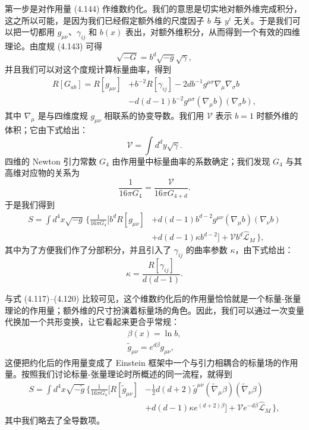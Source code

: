 第一步是对作用量 (4.144) 作维数约化。我们的意思是切实地对额外维完成积分，这之所以可能，是因为我们已经假定额外维的尺度因子 $b$ 与 $y^{i}$ 无关。于是我们可以把一切都用 $g_{\mu\nu}$、$\gamma_{ij}$ 和 $b(x)$ 表出，对额外维积分，从而得到一个有效的四维理论。由度规 (4.143) 可得
\begin{equation*}
\sqrt{-G} = b^{d}\sqrt{-g}\sqrt{\gamma},
\tag{4.145}
\end{equation*}
并且我们可以对这个度规计算标量曲率，得到
\begin{align*}
R[G_{ab}] = R[g_{\mu\nu}] &+ b^{-2}R[\gamma_{ij}] - 2db^{-1}g^{\mu\sigma}\nabla_{\mu}\nabla_{\sigma}b\\
&- d(d-1)b^{-2}g^{\mu\sigma}(\nabla_{\mu}b)(\nabla_{\sigma}b),
\tag{4.146}
\end{align*}
其中 $\nabla_{\mu}$ 是与四维度规 $g_{\mu\nu}$ 相联系的协变导数。我们用 $\mathcal{V}$ 表示 $b=1$ 时额外维的体积；它由下式给出：
\begin{equation*}
\mathcal{V} = \int d^{d}y\sqrt{\gamma}.
\tag{4.147}
\end{equation*}
四维的 Newton 引力常数 $G_{4}$ 由作用量中标量曲率的系数确定；我们发现 $G_{4}$ 与其高维对应物的关系为
\begin{equation*}
\frac{1}{16\pi G_{4}} = \frac{\mathcal{V}}{16\pi G_{4+d}}.
\tag{4.148}
\end{equation*}
于是我们得到
\begin{align*}
S = \int d^{4}x\sqrt{-g}\,\bigg\{ \frac{1}{16\pi G_{4}}\Big[ b^{d}R[g_{\mu\nu}] &+ d(d-1)b^{d-2}g^{\mu\nu}(\nabla_{\mu}b)(\nabla_{\nu}b)\\
&+ d(d-1)\kappa b^{d-2}\Big] + \mathcal{V}b^{d}\widehat{\mathcal{L}}_M\,\bigg\},
\tag{4.149}
\end{align*}
其中为了方便我们作了分部积分，并且引入了 $\gamma_{ij}$ 的曲率参数 $\kappa$，由下式给出：
\begin{equation*}
\kappa = \frac{R[\gamma_{ij}]}{d(d-1)}.
\tag{4.150}
\end{equation*}

与式 (4.117)–(4.120) 比较可见，这个维数约化后的作用量恰恰就是一个标量-张量理论的作用量；额外维的尺寸扮演着标量场的角色。因此，我们可以通过一次变量代换加一个共形变换，让它看起来更合乎常规：
\begin{gather*}
\beta(x) = \ln b,\\
\tilde{g}_{\mu\nu} = e^{d\beta}g_{\mu\nu},
\tag{4.151}
\end{gather*}
这便把约化后的作用量变成了 Einstein 框架中一个与引力相耦合的标量场的作用量。按照我们讨论标量-张量理论时所概述的同一流程，就得到
\begin{align*}
S = \int d^{4}x\sqrt{-\tilde{g}}\,\bigg\{ \frac{1}{16\pi G_{4}}\Big[ R[\tilde{g}_{\mu\nu}] &- \frac{1}{2}d(d+2)\tilde{g}^{\mu\nu}(\widetilde{\nabla}_{\mu}\beta)(\widetilde{\nabla}_{\nu}\beta)\\
&+ d(d-1)\kappa e^{(d+2)\beta}\Big] + \mathcal{V}e^{-d\beta}\widehat{\mathcal{L}}_M\,\bigg\},
\tag{4.152}
\end{align*}
其中我们略去了全导数项。

